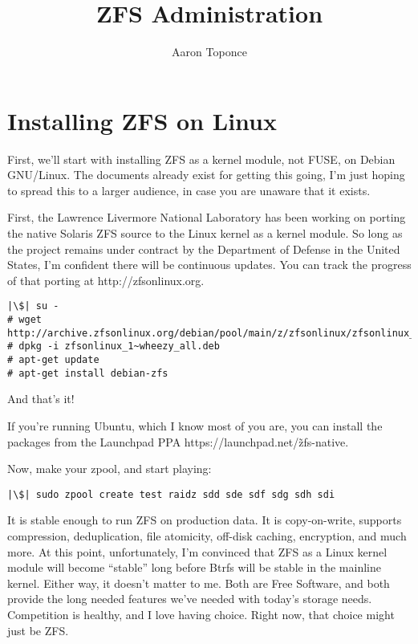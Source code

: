 \documentclass{book}
\begin{document}
\begin{titlepage}
\title{ZFS Administration}
\author{Aaron Toponce}
\maketitle
\end{titlepage}

\chapter{Installing ZFS on Linux}
First, we'll start with installing ZFS as a kernel module, not FUSE, on
Debian GNU/Linux. The documents already exist for getting this going, I’m
just hoping to spread this to a larger audience, in case you are unaware
that it exists.

First, the Lawrence Livermore National Laboratory has been working on
porting the native Solaris ZFS source to the Linux kernel as a kernel
module. So long as the project remains under contract by the Department of
Defense in the United States, I’m confident there will be continuous
updates. You can track the progress of that porting at
http://zfsonlinux.org.

\begin{lstlisting}
|\$| su -
# wget http://archive.zfsonlinux.org/debian/pool/main/z/zfsonlinux/zfsonlinux_1%7Ewheezy_all.deb
# dpkg -i zfsonlinux_1~wheezy_all.deb
# apt-get update
# apt-get install debian-zfs
\end{lstlisting}

And that’s it!

If you’re running Ubuntu, which I know most of you are, you can install the
packages from the Launchpad PPA https://launchpad.net/\~zfs-native.

Now, make your zpool, and start playing:

\begin{lstlisting}
|\$| sudo zpool create test raidz sdd sde sdf sdg sdh sdi
\end{lstlisting}

It is stable enough to run ZFS on production data. It is copy-on-write,
supports compression, deduplication, file atomicity, off-disk caching,
encryption, and much more. At this point, unfortunately, I’m convinced that
ZFS as a Linux kernel module will become “stable” long before Btrfs will be
stable in the mainline kernel. Either way, it doesn’t matter to me. Both
are Free Software, and both provide the long needed features we’ve needed
with today’s storage needs. Competition is healthy, and I love having
choice. Right now, that choice might just be ZFS.
\end{document}

